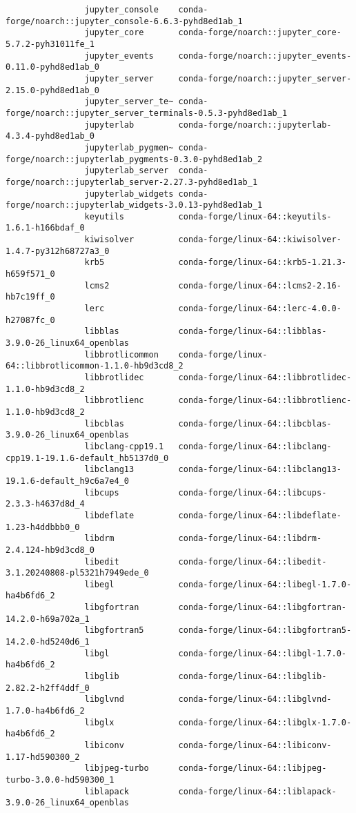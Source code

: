 \documentclass{article}
\begin{document}
\begin{itemize}
\begin{itemize}
\begin{itemize}
\begin{verbatim}
				jupyter_console    conda-forge/noarch::jupyter_console-6.6.3-pyhd8ed1ab_1 
				jupyter_core       conda-forge/noarch::jupyter_core-5.7.2-pyh31011fe_1 
				jupyter_events     conda-forge/noarch::jupyter_events-0.11.0-pyhd8ed1ab_0 
				jupyter_server     conda-forge/noarch::jupyter_server-2.15.0-pyhd8ed1ab_0 
				jupyter_server_te~ conda-forge/noarch::jupyter_server_terminals-0.5.3-pyhd8ed1ab_1 
				jupyterlab         conda-forge/noarch::jupyterlab-4.3.4-pyhd8ed1ab_0 
				jupyterlab_pygmen~ conda-forge/noarch::jupyterlab_pygments-0.3.0-pyhd8ed1ab_2 
				jupyterlab_server  conda-forge/noarch::jupyterlab_server-2.27.3-pyhd8ed1ab_1 
				jupyterlab_widgets conda-forge/noarch::jupyterlab_widgets-3.0.13-pyhd8ed1ab_1 
				keyutils           conda-forge/linux-64::keyutils-1.6.1-h166bdaf_0 
				kiwisolver         conda-forge/linux-64::kiwisolver-1.4.7-py312h68727a3_0 
				krb5               conda-forge/linux-64::krb5-1.21.3-h659f571_0 
				lcms2              conda-forge/linux-64::lcms2-2.16-hb7c19ff_0 
				lerc               conda-forge/linux-64::lerc-4.0.0-h27087fc_0 
				libblas            conda-forge/linux-64::libblas-3.9.0-26_linux64_openblas 
				libbrotlicommon    conda-forge/linux-64::libbrotlicommon-1.1.0-hb9d3cd8_2 
				libbrotlidec       conda-forge/linux-64::libbrotlidec-1.1.0-hb9d3cd8_2 
				libbrotlienc       conda-forge/linux-64::libbrotlienc-1.1.0-hb9d3cd8_2 
				libcblas           conda-forge/linux-64::libcblas-3.9.0-26_linux64_openblas 
				libclang-cpp19.1   conda-forge/linux-64::libclang-cpp19.1-19.1.6-default_hb5137d0_0 
				libclang13         conda-forge/linux-64::libclang13-19.1.6-default_h9c6a7e4_0 
				libcups            conda-forge/linux-64::libcups-2.3.3-h4637d8d_4 
				libdeflate         conda-forge/linux-64::libdeflate-1.23-h4ddbbb0_0 
				libdrm             conda-forge/linux-64::libdrm-2.4.124-hb9d3cd8_0 
				libedit            conda-forge/linux-64::libedit-3.1.20240808-pl5321h7949ede_0 
				libegl             conda-forge/linux-64::libegl-1.7.0-ha4b6fd6_2 
				libgfortran        conda-forge/linux-64::libgfortran-14.2.0-h69a702a_1 
				libgfortran5       conda-forge/linux-64::libgfortran5-14.2.0-hd5240d6_1 
				libgl              conda-forge/linux-64::libgl-1.7.0-ha4b6fd6_2 
				libglib            conda-forge/linux-64::libglib-2.82.2-h2ff4ddf_0 
				libglvnd           conda-forge/linux-64::libglvnd-1.7.0-ha4b6fd6_2 
				libglx             conda-forge/linux-64::libglx-1.7.0-ha4b6fd6_2 
				libiconv           conda-forge/linux-64::libiconv-1.17-hd590300_2 
				libjpeg-turbo      conda-forge/linux-64::libjpeg-turbo-3.0.0-hd590300_1 
				liblapack          conda-forge/linux-64::liblapack-3.9.0-26_linux64_openblas 

\end{verbatim}
\end{itemize}
\end{itemize}
\end{itemize}
\end{document}
